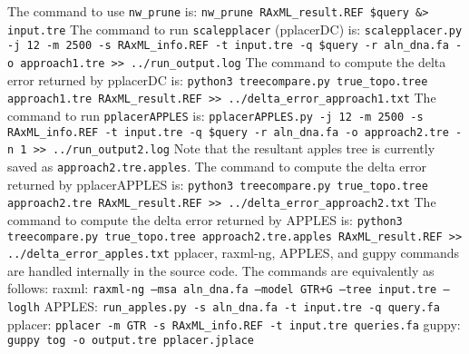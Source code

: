 \documentclass[10pt]{article}
\begin{document}
The command to use \texttt{nw\_prune} is:\newline
\texttt{nw\_prune RAxML\_result.REF \$query \&> input.tre}\newline
The command to run \texttt{scalepplacer} (pplacerDC) is:\newline
\texttt{scalepplacer.py -j 12 -m 2500 -s RAxML\_info.REF -t input.tre -q \$query -r aln\_dna.fa -o approach1.tre >> ../run\_output.log}\newline
The command to compute the delta error returned by pplacerDC is:\newline
\texttt{python3 treecompare.py true\_topo.tree approach1.tre RAxML\_result.REF >> ../delta\_error\_approach1.txt}\newline
The command to run \texttt{pplacerAPPLES} is:\newline
\texttt{pplacerAPPLES.py -j 12 -m 2500 -s RAxML\_info.REF -t input.tre -q \$query -r aln\_dna.fa -o approach2.tre -n 1 >> ../run\_output2.log}\newline
Note that the resultant apples tree is currently saved as \texttt{approach2.tre.apples}.
The command to compute the delta error returned by pplacerAPPLES is:\newline
\texttt{python3 treecompare.py true\_topo.tree approach2.tre RAxML\_result.REF >> ../delta\_error\_approach2.txt}\newline
The command to compute the delta error returned by APPLES is:\newline
\texttt{python3 treecompare.py true\_topo.tree approach2.tre.apples RAxML\_result.REF >> ../delta\_error\_apples.txt}\newline
pplacer, raxml-ng, APPLES, and guppy commands are handled internally in the source code.
The commands are equivalently as follows:
raxml:\newline
\texttt{raxml-ng --msa aln\_dna.fa --model GTR+G --tree input.tre --loglh}\newline
APPLES:\newline
\texttt{run\_apples.py -s aln\_dna.fa -t input.tre -q query.fa}\newline
pplacer:
\texttt{pplacer -m GTR -s RAxML\_info.REF -t input.tre queries.fa}\newline
guppy:
\texttt{guppy tog -o output.tre pplacer.jplace}\newline
\end{document}
